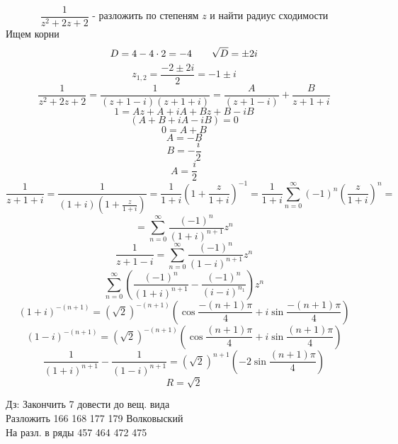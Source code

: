 \documentclass[12pt, fleqn]{article}
\begin{document}
\begin{lect}
   \begin{Task}[7]
       \[\frac{1}{z^2 + 2z + 2} \text{ - разложить по степеням $z$ и найти радиус сходимости}\]
       Ищем корни
       \[D = 4 - 4 \cdot 2 = -4 \qquad \sqrt{D} = \pm2i\]
       \[z_{1, 2} = \frac{-2 \pm 2i}{2} = -1 \pm i \]
       \[\frac{1}{z^2 + 2z + 2} = \frac{1}{(z + 1 - i)(z + 1 + i)} = \frac{A}{(z + 1 - i)} + 
       \frac{B}{z + 1 + i}\]
       \[1 = Az + A + iA + Bz + B - iB\]
       \[(A + B + iA - iB) = 0\]
       \[0 = A + B\]
       \[A = -B\]
       \[B = -\frac{i}{2}\]
       \[A = \frac{i}{2}\]
       \[\frac{1}{z + 1 + i} = \frac{1}{(1 + i)(1 + \frac{z}{1 + i})} = \frac{1}{1 + i} 
       (1 + \frac{z}{1 + i})^{-1} = \frac{1}{1 + i} \sum_{n = 0}^\infty(-1)^n (\frac{z}{1 + i})^n  = \]
       \[= \sum_{n = 0}^\infty \frac{(-1)^n}{(1 + i)^{n + 1} }z^n\]
       \[\frac{1}{z + 1 - i} =  \sum_{n = 0}^\infty 
       \frac{(-1)^n}{(1 - i)^{n + 1} }z^n\]
       \[\sum_{n = 0}^\infty (\frac{(-1)^n}{(1 + i)^{n + 1} } - \frac{(-1)^n}{(i - i)^{n _ 1} })z^n \]
       \[(1 + i)^{-(n + 1)} = (\sqrt{2})^{-(n + 1)} \left(\cos \frac{-(n + 1)\pi}{4} + 
       i\sin \frac{-(n + 1)\pi}{4}\right)  \]
       \[(1 - i)^{-(n + 1)} = (\sqrt{2})^{-(n + 1)} 
       \left(\cos \frac{(n + 1)\pi}{4} + i\sin \frac{(n + 1)\pi }{4}\right)  \]
       \[\frac{1}{(1 + i)^{n + 1} } - \frac{1}{(1 - i)^{n + 1} } = (\sqrt{2})^{n + 1} (-2\sin 
       \frac{(n + 1)\pi}{4}) \]
       \[R = \sqrt{2}\]
   \end{Task}

   Дз: Закончить 7 довести до вещ. вида\\
    Разложить 166 168 177 179 Волковыский\\
    На разл. в ряды 457 464 472 475
\end{lect}
\end{document}
